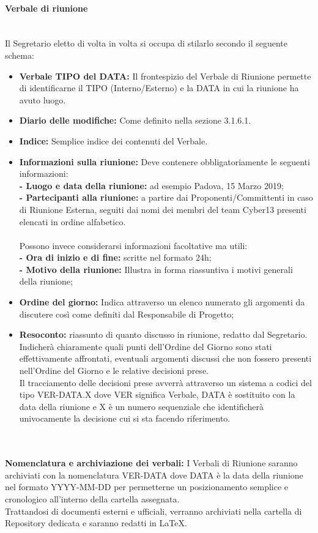    \paragraph{Verbale di riunione}
    ~\\Il Segretario eletto di volta in volta si occupa di stilarlo secondo il seguente schema:
    \begin{itemize}
        \item \textbf{Verbale TIPO del DATA:} Il frontespizio del Verbale di Riunione permette di identificarne il TIPO (Interno/Esterno) e la DATA in cui la riunione ha avuto luogo.
        \item \textbf{Diario delle modifiche:} Come definito nella sezione 3.1.6.1.
        \item \textbf{Indice:} Semplice indice dei contenuti del Verbale.
        \item \textbf{Informazioni sulla riunione:} Deve contenere obbligatoriamente le seguenti informazioni:
        \\ \textbf{- Luogo e data della riunione:} ad esempio Padova, 15 Marzo 2019;
        \\ \textbf{- Partecipanti alla riunione:} a partire dai Proponenti/Committenti in caso di Riunione Esterna, seguiti dai nomi dei membri del team Cyber13 presenti elencati in ordine alfabetico.
        \\\\Possono invece considerarsi informazioni facoltative ma utili:
        \\ \textbf{- Ora di inizio e di fine:} scritte nel formato 24h;
        \\ \textbf{- Motivo della riunione:} Illustra in forma riassuntiva i motivi generali della riunione;
        \item \textbf{Ordine del giorno:} Indica attraverso un elenco numerato gli argomenti da discutere così come definiti dal Responsabile di Progetto;
        \item \textbf{Resoconto:} riassunto di quanto discusso in riunione, redatto dal Segretario. Indicherà chiaramente quali punti dell'Ordine del Giorno sono stati effettivamente affrontati, eventuali argomenti discussi che non fossero presenti nell'Ordine del Giorno e le relative decisioni prese.
        \\Il tracciamento delle decisioni prese avverrà attraverso un sistema a codici del tipo VER-DATA.X dove VER significa Verbale, DATA è sostituito con la data della riunione e X è un numero sequenziale che identificherà univocamente la decisione cui si sta facendo riferimento.
    \end{itemize}
    \\\\ \textbf{Nomenclatura e archiviazione dei verbali:} I Verbali di Riunione saranno archiviati con la nomenclatura VER-DATA dove DATA è la data della riunione nel formato YYYY-MM-DD per permetterne un posizionamento semplice e cronologico all'interno della cartella assegnata.
    \\Trattandosi di documenti esterni e ufficiali, verranno archiviati nella cartella di Repository dedicata e saranno redatti in LaTeX.